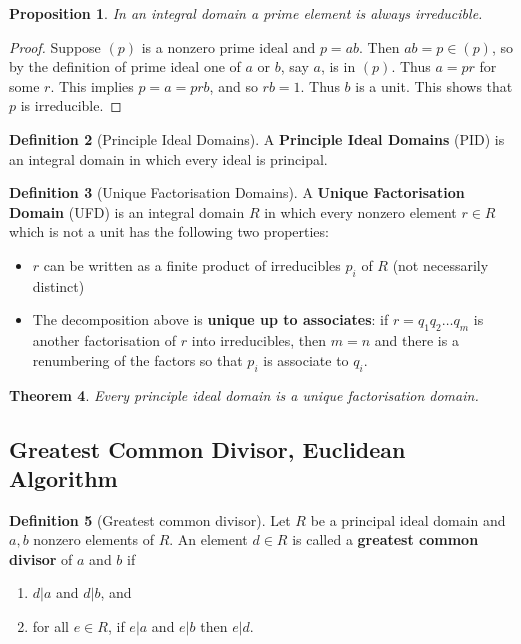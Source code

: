 \documentclass[10pt, oneside, reqno]{amsart}
\theoremstyle{plain}%
\newtheorem{thm}{Theorem}[section]
\newtheorem{prop}[thm]{Proposition}
\theoremstyle{definition}
\newtheorem{defn}[thm]{Definition}
\theoremstyle{remark}
\begin{document}
\begin{prop}
    In an integral domain a prime element is always irreducible.
\end{prop}
\begin{proof}
    Suppose $(p)$ is a nonzero prime ideal and $p = ab$.  Then $ab = p \in (p)$, so by the definition of prime ideal one of $a$ or $b$, say $a$, is in $(p)$.  Thus $a = pr$ for some $r$.  This implies $p = a = prb$, and so $rb = 1$.  Thus $b$ is a unit.  This shows that $p$ is irreducible.
\end{proof}

\begin{defn}[Principle Ideal Domains]
    A \textbf{Principle Ideal Domains} (PID) is an integral domain in which every ideal is principal. 
\end{defn}

\begin{defn}[Unique Factorisation Domains]
    A \textbf{Unique Factorisation Domain} (UFD) is an integral domain $R$ in which every nonzero element $r \in R$ which is not a unit has the following two properties:
    \begin{itemize}
        \item $r$ can be written as a finite product of irreducibles $p_i$ of $R$ (not necessarily distinct)
        \item The decomposition above is \textbf{unique up to associates}: if $r = q_1 q_2 \dots q_m$ is another factorisation of $r$ into irreducibles, then $m = n$ and there is a renumbering of the factors so that $p_i$ is associate to $q_i$. 
        \end{itemize}
\end{defn}

\begin{thm}
    Every principle ideal domain is a unique factorisation domain.
\end{thm}

\subsection{Greatest Common Divisor, Euclidean Algorithm} %
\label{sub:greatest_common_divisor_euclidean_algorithm}
\begin{defn}[Greatest common divisor]
    Let $R$ be a principal ideal domain and $a,b$ nonzero elements of $R$.  An element $d \in R$ is called a \textbf{greatest common divisor} of $a$ and $b$ if 
    \begin{enumerate}
        \item $d | a$ and $d|b$, and
        \item for all $e \in R$, if $e | a$ and $e | b$ then $e | d$.
    \end{enumerate}
\end{defn}
\end{document}
